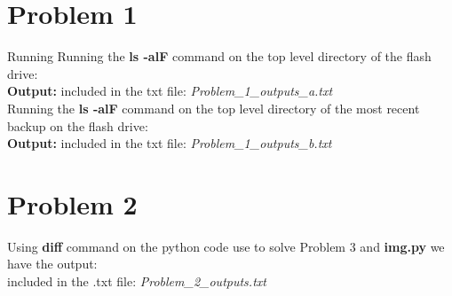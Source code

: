 \documentclass[20pt,letterpaper]{article}
\begin{document}
\section{Problem 1}
Running Running the \textbf{ls -alF} command on the top level directory of the flash drive:\\
\textbf{Output:} included in the txt file: \textit{Problem\_1\_outputs\_a.txt}\\
Running the \textbf{ls -alF} command on the top level directory of the most recent backup on the flash drive:\\
\textbf{Output:} included in the txt file: \textit{Problem\_1\_outputs\_b.txt}
\section{Problem 2}
Using \textbf{diff} command on the python code use to solve Problem 3 and \textbf{img.py} we have the output:\\
included in the .txt file: \textit{Problem\_2\_outputs.txt}
\end{document}
